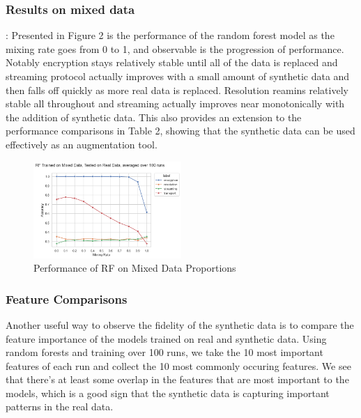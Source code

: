 \documentclass[sigconf, nonacm]{acmart}
\begin{document}
\subsubsection{Results on mixed data}: Presented in Figure 2 is the performance of 
the random forest model as the mixing rate goes from 0 to 1, and observable is the 
progression of performance. Notably encryption stays relatively stable until all of 
the data is replaced and streaming protocol actually improves with a small amount
of synthetic data and then falls off quickly as more real data is replaced. 
Resolution reamins relatively stable all throughout and streaming actually 
improves near monotonically with the addition of synthetic data. This
also provides an extension to the performance comparisons in Table 2, 
showing that the synthetic data can be used effectively as an augmentation
tool.

\begin{figure}[h!]
\includegraphics[width=0.5\textwidth]{../src/evaluation/figures/mixing.png}
\caption{Performance of RF on Mixed Data Proportions}
\label{fig:data_mixing}
\end{figure}
\FloatBarrier

\subsubsection{Feature Comparisons}
Another useful way to observe the fidelity of the synthetic data is to compare
the feature importance of the models trained on real and synthetic data.
Using random forests and training over 100 runs, we take the 10 most important
features of each run and collect the 10 most commonly occuring features.
We see that there's at least some overlap in the features that are most important
to the models, which is a good sign that the synthetic data is capturing 
important patterns in the real data.
\end{document}

